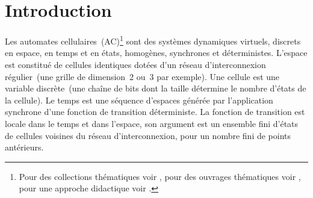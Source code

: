 \chapter{Introduction}

Les automates cellulaires~(AC)\footnote{%
  Pour des collections thématiques voir
  \cite{Demongeot85,Wolfram86a,Legendi87,Gutowitz90a}, %
  pour des ouvrages thématiques voir
  \cite{Preston84,Toffoli87,Jackson91c}, %
  pour une approche didactique voir %
  \cite{Casti89a,Schroeder90a}.} %
sont des systèmes dynamiques virtuels, %
discrets en espace, en temps et en états, homogènes, synchrones et
déterministes. %
L'espace est constitué de cellules identiques dotées d'un réseau
d'interconnexion régulier~(une grille de dimension~2 ou~3 par
exemple). %
Une cellule est une variable discrète~(une chaîne de bits dont la
taille détermine le nombre d'états de la cellule). %
Le temps est une séquence d'espaces générée par l'application
synchrone d'une fonction de transition déterministe. %
La fonction de transition est locale dans le temps et dans l'espace,
son argument est un ensemble fini d'états de cellules voisines du
réseau d'interconnexion, pour un nombre fini de points antérieurs. %

